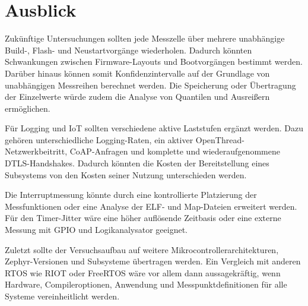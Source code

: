 \chapter{Ausblick}
\label{ch:ausblick}

Zuk{\"u}nftige Untersuchungen sollten jede Messzelle {\"u}ber mehrere unabh{\"a}ngige Build-, Flash- und Neustartvorg{\"a}nge wiederholen. Dadurch k{\"o}nnten Schwankungen zwischen Firmware-Layouts und Bootvorg{\"a}ngen bestimmt werden. Dar{\"u}ber hinaus k{\"o}nnen somit Konfidenzintervalle auf der Grundlage von unabh{\"a}ngigen Messreihen berechnet werden. Die Speicherung oder {\"U}bertragung der Einzelwerte w{\"u}rde zudem die Analyse von Quantilen und Ausrei{\ss}ern erm{\"o}glichen.

F{\"u}r Logging und IoT sollten verschiedene aktive Laststufen erg{\"a}nzt werden. Dazu geh{\"o}ren unterschiedliche Logging-Raten, ein aktiver OpenThread-Netzwerkbeitritt, CoAP-Anfragen und komplette und wiederaufgenommene DTLS-Handshakes. Dadurch k{\"o}nnten die Kosten der Bereitstellung eines Subsystems von den Kosten seiner Nutzung unterschieden werden.

Die Interruptmessung k{\"o}nnte durch eine kontrollierte Platzierung der Messfunktionen oder eine Analyse der ELF- und Map-Dateien erweitert werden. F{\"u}r den Timer-Jitter w{\"a}re eine h{\"o}her aufl{\"o}sende Zeitbasis oder eine externe Messung mit GPIO und Logikanalysator geeignet.

Zuletzt sollte der Versuchsaufbau auf weitere Mikrocontrollerarchitekturen, Zephyr-Versionen und Subsysteme {\"u}bertragen werden. Ein Vergleich mit anderen RTOS wie RIOT oder FreeRTOS w{\"a}re vor allem dann aussagekr{\"a}ftig, wenn Hardware, Compileroptionen, Anwendung und Messpunktdefinitionen f{\"u}r alle Systeme vereinheitlicht werden.
